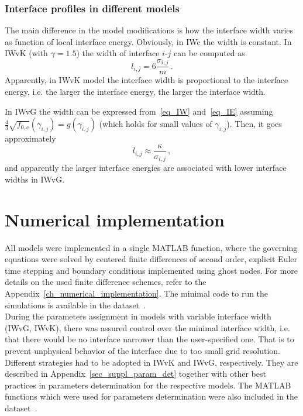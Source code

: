 		\subsubsection{Interface profiles in different models} \label{sec_difference_in_profiles}
		The main difference in the model modifications is how the interface width varies as function of local interface energy. Obviously, in IWc the width is constant. In IWvK (with $\gamma=1.5$) the width of interface $i$-$j$ can be computed as
		\begin{equation}
			l_{i,j} = 6\frac{\sigma_{i,j}}{m} \,.
		\end{equation}
		Apparently, in IWvK model the interface width is proportional to the interface energy, i.e. the larger the interface energy, the larger the interface width.
		
		In IWvG the width can be expressed from~\eqref{eq_IW} and~\eqref{eq_IE} assuming $\frac{4}{3}\sqrt{f_{0,c}}(\gamma_{i,j})=g(\gamma_{i,j})$ (which holds for small values of $\gamma_{i,j}$). Then, it goes approximately
		\begin{equation}
			l_{i,j} \approx \frac{\kappa}{\sigma_{i,j}} \,,
		\end{equation}
		and apparently the larger interface energies are associated with lower interface widths in IWvG. 

\section{Numerical implementation}
All models were implemented in a single MATLAB function, where the governing equations were solved by centered finite differences of second order, explicit Euler time stepping and boundary conditions implemented using ghost nodes. For more details on the used finite difference schemes, refer to the Appendix~\ref{ch_numerical_implementation}. The minimal code to run the simulations is available in the dataset~\cite{Minar2022dataset}. \\
During the parameters assignment in models with variable interface width (IWvG, IWvK), there was assured control over the minimal interface width, i.e. that there would be no interface narrower than the user-specified one. That is to prevent unphysical behavior of the interface due to too small grid resolution. Different strategies had to be adopted in IWvK and IWvG, respectively. They are described in Appendix~\ref{sec_suppl_param_det} together with other best practices in parameters determination for the respective models. The MATLAB functions which were used for parameters determination were also included in the dataset~\cite{Minar2022dataset}.

